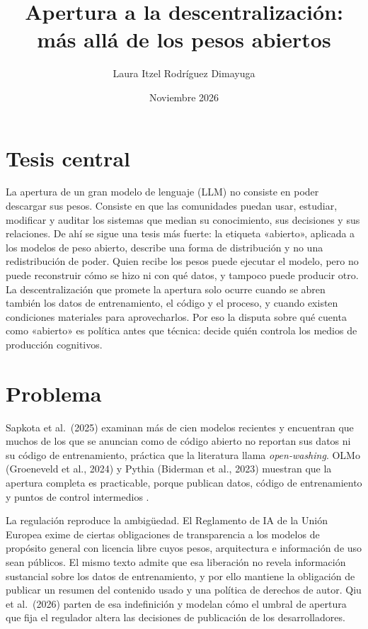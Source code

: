 \documentclass[11pt]{article}
\title{Apertura a la descentralización:\\ más allá de los pesos abiertos}
\author{Laura Itzel Rodríguez Dimayuga}
\date{Noviembre 2026}
\begin{document}
\maketitle

\section*{Tesis central}

La apertura de un gran modelo de lenguaje (LLM) no consiste en poder descargar sus pesos. Consiste en que las comunidades puedan usar, estudiar, modificar y auditar los sistemas que median su conocimiento, sus decisiones y sus relaciones. De ahí se sigue una tesis más fuerte: la etiqueta «abierto», aplicada a los modelos de peso abierto, describe una forma de distribución y no una redistribución de poder. Quien recibe los pesos puede ejecutar el modelo, pero no puede reconstruir cómo se hizo ni con qué datos, y tampoco puede producir otro. La descentralización que promete la apertura solo ocurre cuando se abren también los datos de entrenamiento, el código y el proceso, y cuando existen condiciones materiales para aprovecharlos. Por eso la disputa sobre qué cuenta como «abierto» es política antes que técnica: decide quién controla los medios de producción cognitivos.

\section*{Problema}

Sapkota et al.\ (2025) examinan más de cien modelos recientes y encuentran que muchos de los que se anuncian como de código abierto no reportan sus datos ni su código de entrenamiento, práctica que la literatura llama \textit{open-washing}. OLMo (Groeneveld et al., 2024) y Pythia (Biderman et al., 2023) muestran que la apertura completa es practicable, porque publican datos, código de entrenamiento y puntos de control intermedios .

La regulación reproduce la ambigüedad. El Reglamento de IA de la Unión Europea exime de ciertas obligaciones de transparencia a los modelos de propósito general con licencia libre cuyos pesos, arquitectura e información de uso sean públicos. El mismo texto admite que esa liberación no revela información sustancial sobre los datos de entrenamiento, y por ello mantiene la obligación de publicar un resumen del contenido usado y una política de derechos de autor. Qiu et al.\ (2026) parten de esa indefinición y modelan cómo el umbral de apertura que fija el regulador altera las decisiones de publicación de los desarrolladores.
\end{document}
